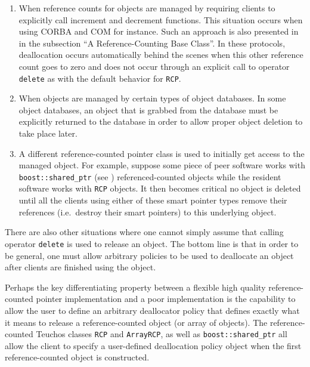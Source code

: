 \documentclass[pdf,ps2pdf,11pt]{SANDreport}
\begin{document}
\begin{enumerate}

{}\item When reference counts for objects are managed by requiring
clients to explicitly call increment and decrement functions.  This
situation occurs when using CORBA {}\cite{ref:corba} and COM
{}\cite{ref:com} for instance.  Such an approach is also presented in
{}\cite[Item 29]{MoreEffectiveC++96} in the subsection ``A
Reference-Counting Base Class''.  In these protocols, deallocation
occurs automatically behind the scenes when this other reference count
goes to zero and does not occur through an explicit call to operator
{}\texttt{delete} as with the default behavior for {}\texttt{RCP}.

{}\item When objects are managed by certain types of object databases.
In some object databases, an object that is grabbed from the database
must be explicitly returned to the database in order to allow proper
object deletion to take place later.

{}\item A different reference-counted pointer class is used to
initially get access to the managed object.  For example, suppose some
piece of peer software works with {}\texttt{boost::shared\_ptr} (see
{}\cite{ref:boost}) referenced-counted objects while the resident
software works with {}\texttt{RCP} objects.  It then becomes critical
no object is deleted until all the clients using either of these smart
pointer types remove their references (i.e.\ destroy their smart
pointers) to this underlying object.

\end{enumerate}

There are also other situations where one cannot simply assume that
calling operator {}\texttt{delete} is used to release an object.  The
bottom line is that in order to be general, one must allow arbitrary
policies to be used to deallocate an object after clients are finished
using the object.

Perhaps the key differentiating property between a flexible high
quality reference-counted pointer implementation and a poor
implementation is the capability to allow the user to define an
arbitrary deallocator policy that defines exactly what it means to
release a reference-counted object (or array of objects).  The
reference-counted Teuchos classes {}\texttt{RCP} and
{}\texttt{ArrayRCP}, as well as {}\texttt{boost::shared\_ptr} all
allow the client to specify a user-defined deallocation policy object
when the first reference-counted object is constructed.
\end{document}
